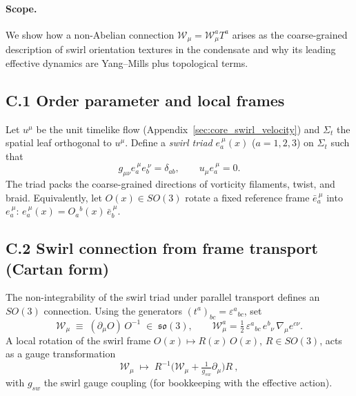 \documentclass[smallextended]{svjour3}       %
\begin{document}
		\paragraph{Scope.}
		We show how a non-Abelian connection \(\mathcal{W}_\mu=\mathcal{W}_\mu^a T^a\) arises as the coarse-grained description of swirl orientation textures in the condensate and why its leading effective dynamics are Yang–Mills plus topological terms.

		\subsection*{C.1 Order parameter and local frames}
		Let \(u^\mu\) be the unit timelike flow (Appendix~\ref{sec:core_swirl_velocity}) and \(\Sigma_t\) the spatial leaf orthogonal to \(u^\mu\).
		Define a \emph{swirl triad} \(e_a^{\ \mu}(x)\) (\(a=1,2,3\)) on \(\Sigma_t\) such that
		\[
		g_{\mu\nu}e_a^{\ \mu}e_b^{\ \nu}=\delta_{ab},\qquad u_\mu e_a^{\ \mu}=0.
		\]
		The triad packs the coarse-grained directions of vorticity filaments, twist, and braid. Equivalently, let \(O(x)\in SO(3)\) rotate a fixed reference frame \(\bar e_a^{\ \mu}\) into \(e_a^{\ \mu}\):
		\(e_a^{\ \mu}(x)=O_a{}^{b}(x)\,\bar e_b^{\ \mu}\).

		\subsection*{C.2 Swirl connection from frame transport (Cartan form)}
		The non-integrability of the swirl triad under parallel transport defines an \(SO(3)\) connection.
		Using the generators \((t^a)_{bc}=\varepsilon^a{}_{bc}\), set
		\[
		\boxed{\quad \mathcal{W}_\mu \;\equiv\; (\partial_\mu O)\,O^{-1} \;\in\; \mathfrak{so}(3), \qquad
		\mathcal{W}_\mu^a=\tfrac12\,\varepsilon^{a}{}_{bc}\,e^{b}{}_{\nu}\,\nabla_\mu e^{c\nu}. \quad}
		\]
		A local rotation of the swirl frame \(O(x)\mapsto R(x)\,O(x)\), \(R\in SO(3)\), acts as a gauge transformation
		\[
		\boxed{\quad \mathcal{W}_\mu \;\longmapsto\; R^{-1}\!\Big(\mathcal{W}_\mu + \tfrac{1}{g_{\!sw}}\partial_\mu\Big)R\ ,\quad}
		\]
		with \(g_{\!sw}\) the swirl gauge coupling (for bookkeeping with the effective action).
\end{document}

